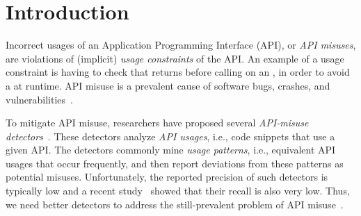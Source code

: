 \section{Introduction}
\label{sec:intro}

Incorrect usages of an Application Programming Interface (API), or \emph{API misuses}, are violations of (implicit) \emph{usage constraints} of the API.
An example of a usage constraint is having to check that  returns  before calling  on an , in order to avoid a  at runtime.
API misuse is a prevalent cause of software bugs, crashes, and vulnerabilities~\cite{MM13,SHA15,FHMB+12,EBFK13,NKMB16,GIJA+12,ANNN+16}.

%
To mitigate API misuse, researchers have proposed several \emph{API-misuse detectors}~\cite{LZ05,L07,WZL07,RGJ07,NNP+09,AX09,TX09,TX09b,WZ11,MM13,NPVN16}.
These detectors analyze \emph{API usages}, i.e., code snippets that use a given API.
The detectors commonly mine \emph{usage patterns}, i.e., equivalent API usages that occur frequently, and then report deviations from these patterns as potential misuses.
%
Unfortunately, the reported precision of such detectors is typically low and a recent study~\cite{ANNN+17} showed that their recall is also very low. 
Thus, we need better detectors to address the still-prevalent problem of API misuse~\cite{LHXRM16,ABFKMS16}.



